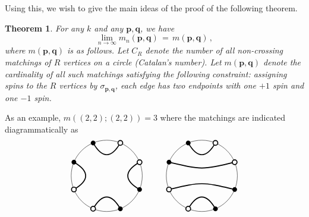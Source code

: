 \documentclass[12pt]{report}
\newtheorem{theorem}{Theorem}[section]
\theoremstyle{definition}
\begin{document}
Using this, we wish to give the main ideas of the proof of the following theorem.  
\begin{theorem}
\label{thm:MMM}
For any $k$ and any $\mathbf{p},\mathbf{q}$, we have
$$
\lim_{n \to \infty} m_n(\mathbf{p},\mathbf{q})\, =\, m(\mathbf{p},\mathbf{q})\, ,
$$
where $m(\mathbf{p},\mathbf{q})$ is as follows.
Let $C_R$ denote the number of all non-crossing matchings of
$R$ vertices on a circle (Catalan's number).
Let $m(\mathbf{p},\mathbf{q})$ denote the cardinality of all such matchings
satisfying the following constraint: assigning spins to the $R$ vertices by 
 $\sigma_{\mathbf{p},\mathbf{q}}$,  
each edge has two endpoints with one $+1$ spin and one $-1$ spin.
\end{theorem}
As an example,  
$m((2,2);(2,2)) = 3$ where the matchings are indicated diagrammatically as
$$
\begin{tikzpicture}
\draw (0,0) circle (1.5cm);
\draw[very thick] (67.5:1.5cm) .. controls (75:0.75cm) and (105:0.75cm)  .. (112.5:1.5cm);
\draw[very thick] (22.5:1.5cm) .. controls (15:0.75cm) and (-15:0.75cm)  .. (-22.5:1.5cm);
\draw[very thick] (-67.5:1.5cm) .. controls (-75:0.75cm) and (-105:0.75cm)  .. (-112.5:1.5cm);
\draw[very thick] (157.5:1.5cm) .. controls (165:0.75cm) and (195:0.75cm)  .. (202.5:1.5cm);
\fill (157.5:1.5cm) circle (1mm);
\fill (112.5:1.5cm) circle (1mm);
\filldraw[fill=white, very thick] (67.5:1.5cm) circle (1mm);
\filldraw[fill=white, very thick] (22.5:1.5cm) circle (1mm);
\fill (-22.5:1.5cm) circle (1mm);
\fill (-67.5:1.5cm) circle (1mm);
\filldraw[fill=white, very thick] (-112.5:1.5cm) circle (1mm);
\filldraw[fill=white, very thick] (-157.5:1.5cm) circle (1mm);
\end{tikzpicture}
\hspace{1cm}
\begin{tikzpicture}
\draw (0,0) circle (1.5cm);
\draw[very thick] (67.5:1.5cm) .. controls (75:0.75cm) and (105:0.75cm)  .. (112.5:1.5cm);
\draw[very thick] (22.5:1.5cm) .. controls (90:0.25cm) ..  (157.5:1.5cm);
\draw[very thick] (-22.5:1.5cm) .. controls (-90:0.25cm) ..  (-157.5:1.5cm);
\draw[very thick] (-67.5:1.5cm) .. controls (-75:0.75cm) and (-105:0.75cm)  .. (-112.5:1.5cm);
\fill (157.5:1.5cm) circle (1mm);
\fill (112.5:1.5cm) circle (1mm);
\filldraw[fill=white, very thick] (67.5:1.5cm) circle (1mm);
\filldraw[fill=white, very thick] (22.5:1.5cm) circle (1mm);
\fill (-22.5:1.5cm) circle (1mm);
\fill (-67.5:1.5cm) circle (1mm);
\filldraw[fill=white, very thick] (-112.5:1.5cm) circle (1mm);
\filldraw[fill=white, very thick] (-157.5:1.5cm) circle (1mm);

\end{tikzpicture}$$
\end{document}
